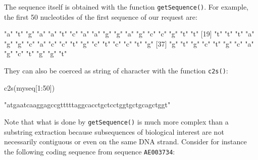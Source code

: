 \documentclass{article}
\begin{document}
The sequence itself is obtained with the function \texttt{getSequence()}.
For example, the first 50 nucleotides of the first sequence of our request are:

\begin{Schunk}
\begin{Soutput}
 [1] "a" "t" "g" "a" "a" "t" "c" "a" "a" "g" "g" "a" "g" "c" "c" "g" "t" "t"
[19] "t" "t" "t" "a" "g" "g" "c" "a" "c" "c" "t" "g" "c" "t" "c" "c" "t" "g"
[37] "g" "t" "g" "c" "t" "g" "c" "a" "g" "c" "t" "g" "g" "t"
\end{Soutput}
\end{Schunk}
They can also be coerced as string of character with the function \texttt{c2s()}:
\begin{Schunk}
\begin{Sinput}
 c2s(myseq[1:50])
\end{Sinput}
\begin{Soutput}
[1] "atgaatcaaggagccgtttttaggcacctgctcctggtgctgcagctggt"
\end{Soutput}
\end{Schunk}
Note that what is done by \texttt{getSequence()} is much more complex
than a substring extraction because subsequences of biological interest are
not necessarily contiguous or even on the same DNA strand. Consider for
instance the following coding sequence from sequence \texttt{AE003734}:
\end{document}
